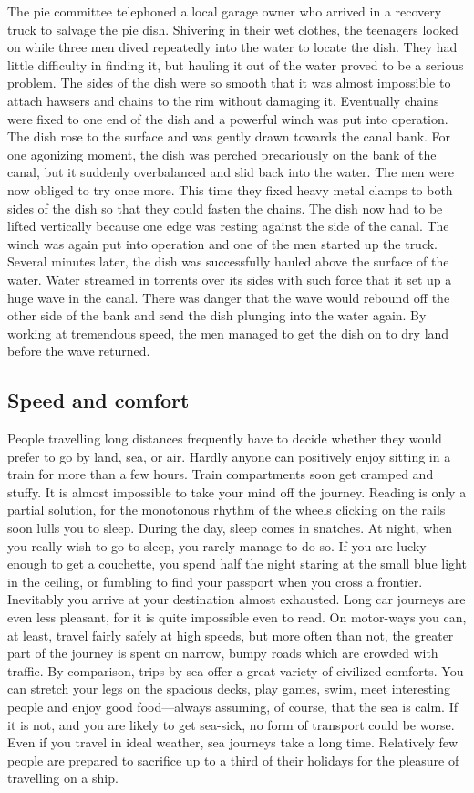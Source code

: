 \documentclass[11pt]{article}
\begin{document}
The pie committee telephoned a local garage owner who arrived in a recovery truck to salvage the pie dish. Shivering in their wet clothes, the teenagers looked on while three men dived repeatedly into the water to locate the dish. They had little difficulty in finding it, but hauling it out of the water proved to be a serious problem. The sides of the dish were so smooth that it was almost impossible to attach hawsers and chains to the rim without damaging it. Eventually chains were fixed to one end of the dish and a powerful winch was put into operation. The dish rose to the surface and was gently drawn towards the canal bank. For one agonizing moment, the dish was perched precariously on the bank of the canal, but it suddenly overbalanced and slid back into the water. The men were now obliged to try once more. This time they fixed heavy metal clamps to both sides of the dish so that they could fasten the chains. The dish now had to be lifted vertically because one edge was resting against the side of the canal. The winch was again put into operation and one of the men started up the truck. Several minutes later, the dish was successfully hauled above the surface of the water. Water streamed in torrents over its sides with such force that it set up a huge wave in the canal. There was danger that the wave would rebound off the other side of the bank and send the dish plunging into the water again. By working at tremendous speed, the men managed to get the dish on to dry land before the wave returned. 
\subsection{Speed and comfort}
\label{sec-1-44}

People travelling long distances frequently have to decide whether they would prefer to go by land, sea, or air. Hardly anyone can positively enjoy sitting in a train for more than a few hours. Train compartments soon get cramped and stuffy. It is almost impossible to take your mind off the journey. Reading is only a partial solution, for the monotonous rhythm of the wheels clicking on the rails soon lulls you to sleep. During the day, sleep comes in snatches. At night, when you really wish to go to sleep, you rarely manage to do so. If you are lucky enough to get a couchette, you spend half the night staring at the small blue light in the ceiling, or fumbling to find your passport when you cross a frontier. Inevitably you arrive at your destination almost exhausted. Long car journeys are even less pleasant, for it is quite impossible even to read. On motor-ways you can, at least, travel fairly safely at high speeds, but more often than not, the greater part of the journey is spent on narrow, bumpy roads which are crowded with traffic. By comparison, trips by sea offer a great variety of civilized comforts. You can stretch your legs on the spacious decks, play games, swim, meet interesting people and enjoy good food---always assuming, of course, that the sea is calm. If it is not, and you are likely to get sea-sick, no form of transport could be worse. Even if you travel in ideal weather, sea journeys take a long time. Relatively few people are prepared to sacrifice up to a third of their holidays for the pleasure of travelling on a ship. 
\end{document}
